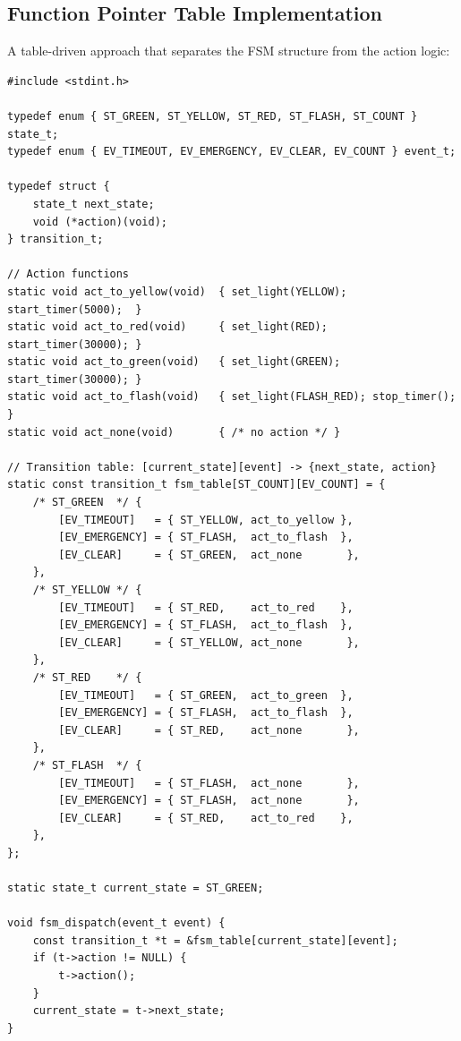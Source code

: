 \subsection{Function Pointer Table Implementation}

A table-driven approach that separates the FSM structure from the action logic:

\begin{lstlisting}[style=C, caption={Table-driven FSM using function pointers.}]
#include <stdint.h>

typedef enum { ST_GREEN, ST_YELLOW, ST_RED, ST_FLASH, ST_COUNT } state_t;
typedef enum { EV_TIMEOUT, EV_EMERGENCY, EV_CLEAR, EV_COUNT } event_t;

typedef struct {
    state_t next_state;
    void (*action)(void);
} transition_t;

// Action functions
static void act_to_yellow(void)  { set_light(YELLOW);    start_timer(5000);  }
static void act_to_red(void)     { set_light(RED);       start_timer(30000); }
static void act_to_green(void)   { set_light(GREEN);     start_timer(30000); }
static void act_to_flash(void)   { set_light(FLASH_RED); stop_timer();       }
static void act_none(void)       { /* no action */ }

// Transition table: [current_state][event] -> {next_state, action}
static const transition_t fsm_table[ST_COUNT][EV_COUNT] = {
    /* ST_GREEN  */ {
        [EV_TIMEOUT]   = { ST_YELLOW, act_to_yellow },
        [EV_EMERGENCY] = { ST_FLASH,  act_to_flash  },
        [EV_CLEAR]     = { ST_GREEN,  act_none       },
    },
    /* ST_YELLOW */ {
        [EV_TIMEOUT]   = { ST_RED,    act_to_red    },
        [EV_EMERGENCY] = { ST_FLASH,  act_to_flash  },
        [EV_CLEAR]     = { ST_YELLOW, act_none       },
    },
    /* ST_RED    */ {
        [EV_TIMEOUT]   = { ST_GREEN,  act_to_green  },
        [EV_EMERGENCY] = { ST_FLASH,  act_to_flash  },
        [EV_CLEAR]     = { ST_RED,    act_none       },
    },
    /* ST_FLASH  */ {
        [EV_TIMEOUT]   = { ST_FLASH,  act_none       },
        [EV_EMERGENCY] = { ST_FLASH,  act_none       },
        [EV_CLEAR]     = { ST_RED,    act_to_red    },
    },
};

static state_t current_state = ST_GREEN;

void fsm_dispatch(event_t event) {
    const transition_t *t = &fsm_table[current_state][event];
    if (t->action != NULL) {
        t->action();
    }
    current_state = t->next_state;
}
\end{lstlisting}

